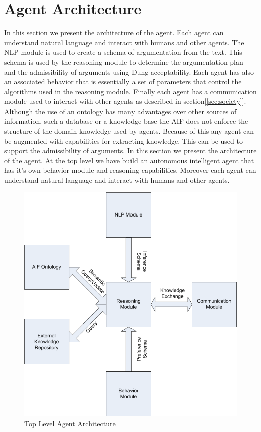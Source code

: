 \section{Agent Architecture}
\label{sec:application}

In this section we present the architecture of the agent. Each agent can understand natural language and interact with humans and other agents. The NLP module is used to create a schema of argumentation from the text. This schema is used by the reasoning module to determine the argumentation plan and the admissibility of arguments using Dung acceptability\cite{dung}. Each agent has also an associated behavior that is essentially a set of parameters that control the algorithms used in the reasoning module. Finally each agent has a communication module used to interact with other agents as described in section[\ref{sec:society}].
Although the use of an ontology has many advantages over other sources of information, such a database or a knowledge base the AIF does not enforce the structure of the domain knowledge used by agents. Because of this any agent can be augmented with capabilities for extracting knowledge. This can be used to support the admissibility of arguments.
In this section we present the architecture of the agent. At the top level we have build an autonomous intelligent agent that has it's own behavior module and reasoning capabilities. Moreover each agent can understand natural language and interact with humans and other agents.
\begin{figure}[t]
\centering
\includegraphics[scale=0.47]{images/TopLevelAgentStructure}
\caption{Top Level Agent Architecture}
\label{fig:arch}
\end{figure}

